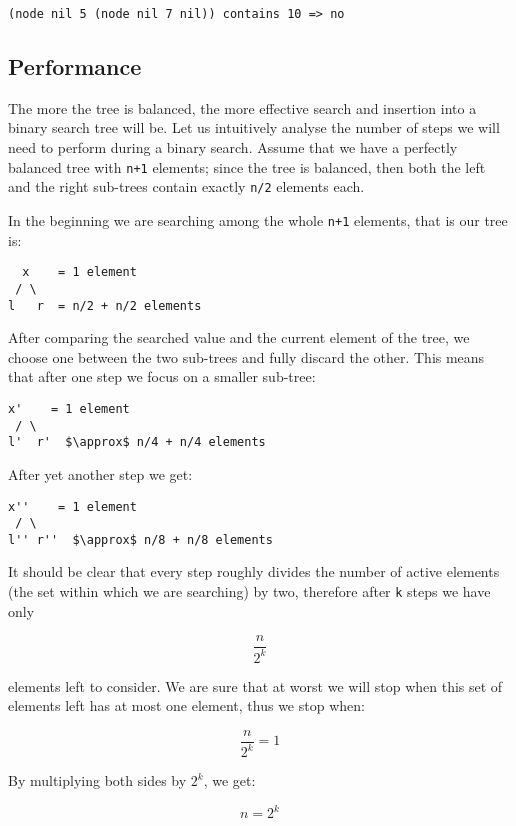 \begin{lstlisting}
(node nil 5 (node nil 7 nil)) contains 10 => no
\end{lstlisting}


\subsection{Performance}
The more the tree is balanced, the more effective search and insertion into a binary search tree will be. Let us intuitively analyse the number of steps we will need to perform during a binary search. Assume that we have a perfectly balanced tree with \texttt{n+1} elements; since the tree is balanced, then both the left and the right sub-trees contain exactly \texttt{n/2} elements each.

In the beginning we are searching among the whole \texttt{n+1} elements, that is our tree is:

\begin{lstlisting}
  x    = 1 element
 / \
l   r  = n/2 + n/2 elements
\end{lstlisting}


After comparing the searched value and the current element of the tree, we choose one between the two sub-trees and fully discard the other. This means that after one step we focus on a smaller sub-tree:

\begin{lstlisting}[mathescape=true]
  x'    = 1 element
 / \
l'  r'  $\approx$ n/4 + n/4 elements
\end{lstlisting}

After yet another step we get:

\begin{lstlisting}[mathescape=true]
  x''    = 1 element
 / \
l'' r''  $\approx$ n/8 + n/8 elements
\end{lstlisting}

It should be clear that every step roughly divides the number of active elements (the set within which we are searching) by two, therefore after \texttt{k} steps we have only 

$$\frac{n}{2^k}$$

elements left to consider. We are sure that at worst we will stop when this set of elements left has at most one element, thus we stop when:

$$\frac{n}{2^k} = 1$$

By multiplying both sides by $2^k$, we get:

$$n = 2^k$$

